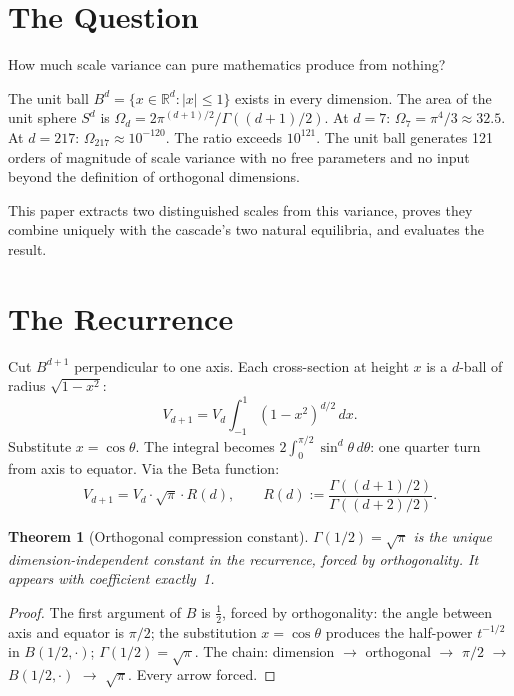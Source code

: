 \documentclass[11pt,a4paper]{article}
\newtheorem{theorem}{Theorem}[section]
\begin{document}
\section{The Question}

How much scale variance can pure mathematics produce from nothing?

The unit ball $B^d = \{x\in\mathbb{R}^d : |x|\leq 1\}$ exists in every
dimension. The area of the unit sphere $S^d$ is
$\Omega_d = 2\pi^{(d+1)/2}/\Gamma((d+1)/2)$. At $d = 7$:
$\Omega_7 = \pi^4/3\approx 32.5$. At $d = 217$:
$\Omega_{217}\approx 10^{-120}$. The ratio exceeds $10^{121}$. The unit
ball generates 121 orders of magnitude of scale variance with no free
parameters and no input beyond the definition of orthogonal dimensions.

This paper extracts two distinguished scales from this variance, proves
they combine uniquely with the cascade's two natural equilibria, and evaluates
the result.

\section{The Recurrence}

Cut $B^{d+1}$ perpendicular to one axis. Each cross-section at height $x$
is a $d$-ball of radius $\sqrt{1-x^2}$:
\begin{equation}\label{eq:slice}
V_{d+1} = V_d\int_{-1}^{1}(1-x^2)^{d/2}\,dx.
\end{equation}
Substitute $x = \cos\theta$. The integral becomes
$2\int_0^{\pi/2}\sin^d\theta\,d\theta$: one quarter turn from axis to
equator. Via the Beta function:
\begin{equation}\label{eq:recurrence}
V_{d+1} = V_d\cdot\sqrt{\pi}\cdot R(d), \qquad
R(d) := \frac{\Gamma((d+1)/2)}{\Gamma((d+2)/2)}.
\end{equation}

\begin{theorem}[Orthogonal compression constant]\label{thm:sqrtpi}
$\Gamma(1/2) = \sqrt{\pi}$ is the unique dimension-independent constant in
the recurrence, forced by orthogonality. It appears with coefficient
exactly~1.
\end{theorem}

\begin{proof}
The first argument of $B$ is $\frac{1}{2}$, forced by orthogonality: the
angle between axis and equator is $\pi/2$; the substitution
$x = \cos\theta$ produces the half-power $t^{-1/2}$ in $B(1/2,\cdot)$;
$\Gamma(1/2) = \sqrt{\pi}$. The chain: dimension $\to$ orthogonal $\to$
$\pi/2$ $\to$ $B(1/2,\cdot)$ $\to$ $\sqrt{\pi}$. Every arrow forced.
\end{proof}
\end{document}
